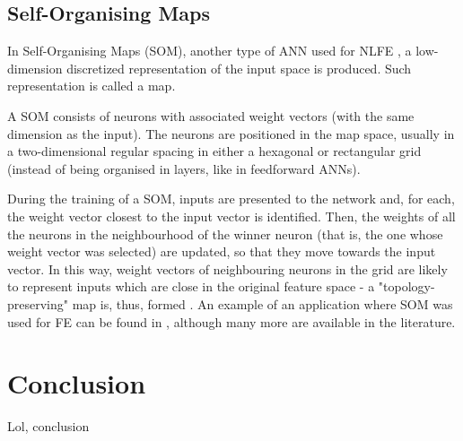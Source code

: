 \documentclass[9pt,journal,compsoc]{IEEEtran}
\begin{document}
\subsection{Self-Organising Maps}

In Self-Organising Maps (SOM), another type of ANN used for NLFE \cite{jain2000statistical, hira2015review}, a low-dimension discretized representation of the input space is produced. Such representation is called a map.

A SOM consists of neurons with associated weight vectors (with the same dimension as the input). The neurons are positioned in the map space, usually in a two-dimensional regular spacing in either a hexagonal or rectangular grid (instead of being organised in layers, like in feedforward ANNs).

During the training of a SOM, inputs are presented to the network and, for each, the weight vector closest to the input vector is identified. Then, the weights of all the neurons in the neighbourhood of the winner neuron (that is, the one whose weight vector was selected) are updated, so that they move towards the input vector. In this way, weight vectors of neighbouring neurons in the grid are likely to represent inputs which are close in the original feature space - a "topology-preserving" map is, thus, formed \cite{kohonen1995self, villmann1997topology}. An example of an application where SOM was used for FE can be found in \cite{lawrence1997face}, although many more are available in the literature.

\section{Conclusion}\label{sec:conclusion}

Lol, conclusion



\end{document}

